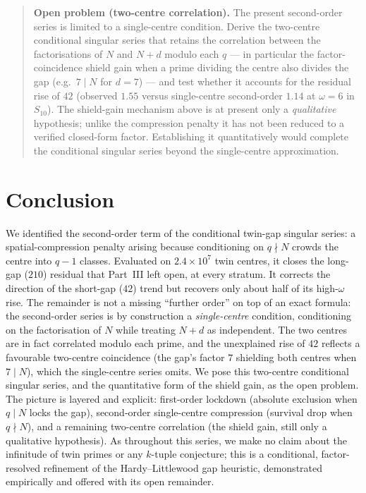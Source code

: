 \documentclass[11pt]{article}
\begin{document}
\begin{quote}
\textbf{Open problem (two-centre correlation).} The present second-order series
is limited to a single-centre condition. Derive the two-centre conditional
singular series that retains the correlation between the factorisations of $N$
and $N+d$ modulo each $q$ --- in particular the factor-coincidence shield gain
when a prime dividing the centre also divides the gap (e.g.\ $7\mid N$ for
$d=7$) --- and test whether it accounts for the residual rise of $42$ (observed
$1.55$ versus single-centre second-order $1.14$ at $\omega=6$ in $S_{10}$). The
shield-gain mechanism above is at present only a \emph{qualitative} hypothesis;
unlike the compression penalty it has not been reduced to a verified closed-form
factor. Establishing it quantitatively would complete the conditional singular
series beyond the single-centre approximation.
\end{quote}

\section{Conclusion}

We identified the second-order term of the conditional twin-gap singular series:
a spatial-compression penalty arising because conditioning on $q\nmid N$ crowds
the centre into $q-1$ classes. Evaluated on $2.4\times10^{7}$ twin centres, it
closes the long-gap ($210$) residual that Part~III left open, at every stratum.
It corrects the direction of the short-gap ($42$) trend but recovers only about
half of its high-$\omega$ rise. The remainder is not a missing ``further order''
on top of an exact formula: the second-order series is by construction a
\emph{single-centre} condition, conditioning on the factorisation of $N$ while
treating $N+d$ as independent. The two centres are in fact correlated modulo each
prime, and the unexplained rise of $42$ reflects a favourable two-centre
coincidence (the gap's factor $7$ shielding both centres when $7\mid N$), which
the single-centre series omits. We pose this two-centre conditional singular
series, and the quantitative form of the shield gain, as the open problem. The
picture is layered and explicit: first-order lockdown (absolute exclusion when
$q\mid N$ locks the gap), second-order single-centre compression (survival drop
when $q\nmid N$), and a remaining two-centre correlation (the shield gain, still
only a qualitative hypothesis). As throughout this series, we make no claim about
the infinitude of twin primes or any $k$-tuple conjecture; this is a conditional,
factor-resolved refinement of the Hardy--Littlewood gap heuristic, demonstrated
empirically and offered with its open remainder.
\end{document}
